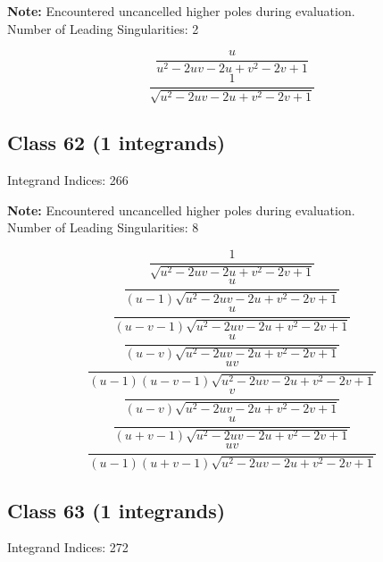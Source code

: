 \documentclass[11pt,a4paper]{article}
\begin{document}
\textbf{Note:} Encountered uncancelled higher poles during evaluation.\\[1em]

Number of Leading Singularities: 2

\begin{equation}
\frac{u}{u^2-2 u v-2 u+v^2-2 v+1}
\end{equation}
\begin{equation}
\frac{1}{\sqrt{u^2-2 u v-2 u+v^2-2 v+1}}
\end{equation}


\subsection*{Class 62 (1 integrands)}
Integrand Indices: 266

\textbf{Note:} Encountered uncancelled higher poles during evaluation.\\[1em]

Number of Leading Singularities: 8

\begin{equation}
\frac{1}{\sqrt{u^2-2 u v-2 u+v^2-2 v+1}}
\end{equation}
\begin{equation}
\frac{u}{(u-1) \sqrt{u^2-2 u v-2 u+v^2-2 v+1}}
\end{equation}
\begin{equation}
\frac{u}{(u-v-1) \sqrt{u^2-2 u v-2 u+v^2-2 v+1}}
\end{equation}
\begin{equation}
\frac{u}{(u-v) \sqrt{u^2-2 u v-2 u+v^2-2 v+1}}
\end{equation}
\begin{equation}
\frac{u v}{(u-1) (u-v-1) \sqrt{u^2-2 u v-2 u+v^2-2 v+1}}
\end{equation}
\begin{equation}
\frac{v}{(u-v) \sqrt{u^2-2 u v-2 u+v^2-2 v+1}}
\end{equation}
\begin{equation}
\frac{u}{(u+v-1) \sqrt{u^2-2 u v-2 u+v^2-2 v+1}}
\end{equation}
\begin{equation}
\frac{u v}{(u-1) (u+v-1) \sqrt{u^2-2 u v-2 u+v^2-2 v+1}}
\end{equation}


\subsection*{Class 63 (1 integrands)}
Integrand Indices: 272
\end{document}
